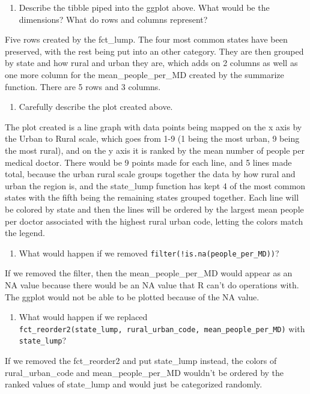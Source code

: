 \documentclass[
  letterpaper,
  DIV=11,
  numbers=noendperiod]{scrartcl}
\providecommand{\tightlist}{%
  \setlength{\itemsep}{0pt}\setlength{\parskip}{0pt}}
\begin{document}
\begin{enumerate}
\def\labelenumi{\alph{enumi})}
\tightlist
\item
  Describe the tibble piped into the ggplot above. What would be the
  dimensions? What do rows and columns represent?
\end{enumerate}

Five rows created by the fct\_lump. The four most common states have
been preserved, with the rest being put into an other category. They are
then grouped by state and how rural and urban they are, which adds on 2
columns as well as one more column for the mean\_people\_per\_MD created
by the summarize function. There are 5 rows and 3 columns.

\begin{enumerate}
\def\labelenumi{\alph{enumi})}
\setcounter{enumi}{1}
\tightlist
\item
  Carefully describe the plot created above.
\end{enumerate}

The plot created is a line graph with data points being mapped on the x
axis by the Urban to Rural scale, which goes from 1-9 (1 being the most
urban, 9 being the most rural), and on the y axis it is ranked by the
mean number of people per medical doctor. There would be 9 points made
for each line, and 5 lines made total, because the urban rural scale
groups together the data by how rural and urban the region is, and the
state\_lump function has kept 4 of the most common states with the fifth
being the remaining states grouped together. Each line will be colored
by state and then the lines will be ordered by the largest mean people
per doctor associated with the highest rural urban code, letting the
colors match the legend.

\begin{enumerate}
\def\labelenumi{\alph{enumi})}
\setcounter{enumi}{2}
\tightlist
\item
  What would happen if we removed
  \texttt{filter(!is.na(people\_per\_MD))}?
\end{enumerate}

If we removed the filter, then the mean\_people\_per\_MD would appear as
an NA value because there would be an NA value that R can't do
operations with. The ggplot would not be able to be plotted because of
the NA value.

\begin{enumerate}
\def\labelenumi{\alph{enumi})}
\setcounter{enumi}{3}
\tightlist
\item
  What would happen if we replaced
  \texttt{fct\_reorder2(state\_lump,\ rural\_urban\_code,\ mean\_people\_per\_MD)}
  with \texttt{state\_lump}?
\end{enumerate}

If we removed the fct\_reorder2 and put state\_lump instead, the colors
of rural\_urban\_code and mean\_people\_per\_MD wouldn't be ordered by
the ranked values of state\_lump and would just be categorized randomly.
\end{document}
